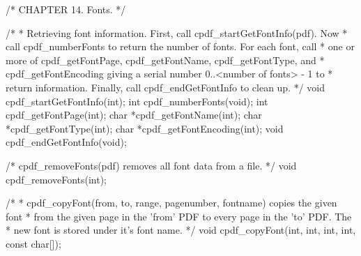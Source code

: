/* CHAPTER 14. Fonts. */

/*
 * Retrieving font information. First, call cpdf_startGetFontInfo(pdf). Now
 * call cpdf_numberFonts to return the number of fonts. For each font, call
 * one or more of cpdf_getFontPage, cpdf_getFontName, cpdf_getFontType, and
 * cpdf_getFontEncoding giving a serial number 0..<number of fonts> - 1 to
 * return information. Finally, call cpdf_endGetFontInfo to clean up.
 */
void cpdf_startGetFontInfo(int);
int cpdf_numberFonts(void);
int cpdf_getFontPage(int);
char *cpdf_getFontName(int);
char *cpdf_getFontType(int);
char *cpdf_getFontEncoding(int);
void cpdf_endGetFontInfo(void);

/* cpdf_removeFonts(pdf) removes all font data from a file. */
void cpdf_removeFonts(int);

/*
 * cpdf_copyFont(from, to, range, pagenumber, fontname) copies the given font
 * from the given page in the 'from' PDF to every page in the 'to' PDF. The
 * new font is stored under it's font name.
 */
void cpdf_copyFont(int, int, int, int, const char[]);

